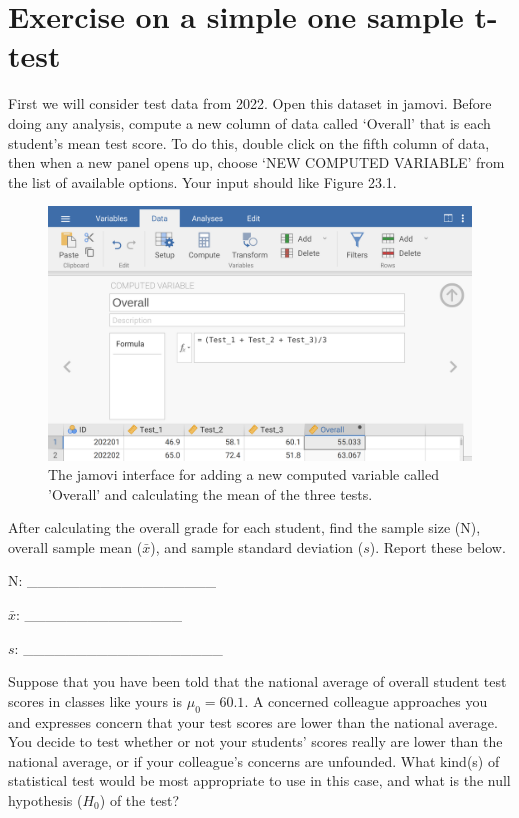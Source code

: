 \documentclass[
  openany]{scrbook}
\begin{document}
\hypertarget{exercise-on-a-simple-one-sample-t-test}{%
\section{Exercise on a simple one sample t-test}\label{exercise-on-a-simple-one-sample-t-test}}

First we will consider test data from 2022.
Open this dataset in jamovi.
Before doing any analysis, compute a new column of data called `Overall' that is each student's mean test score.
To do this, double click on the fifth column of data, then when a new panel opens up, choose `NEW COMPUTED VARIABLE' from the list of available options.
Your input should like Figure 23.1.

\begin{figure}
\includegraphics[width=1\linewidth]{img/jamovi_students_overall} \caption{The jamovi interface for adding a new computed variable called 'Overall' and calculating the mean of the three tests.}\label{fig:unnamed-chunk-89}
\end{figure}

After calculating the overall grade for each student, find the sample size (N), overall sample mean (\(\bar{x}\)), and sample standard deviation (\(s\)).
Report these below.

N: \_\_\_\_\_\_\_\_\_\_\_\_\_\_\_\_\_\_

\(\bar{x}\): \_\_\_\_\_\_\_\_\_\_\_\_\_\_\_

\(s\): \_\_\_\_\_\_\_\_\_\_\_\_\_\_\_\_\_\_\_

Suppose that you have been told that the national average of overall student test scores in classes like yours is \(\mu_{0} = 60.1\).
A concerned colleague approaches you and expresses concern that your test scores are lower than the national average.
You decide to test whether or not your students' scores really are lower than the national average, or if your colleague's concerns are unfounded.
What kind(s) of statistical test would be most appropriate to use in this case, and what is the null hypothesis (\(H_{0}\)) of the test?
\end{document}
